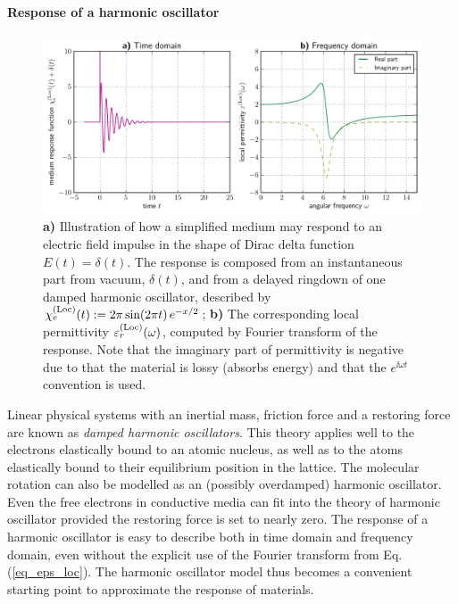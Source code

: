\paragraph{Response of a harmonic oscillator} \label{chap_lorentzmedia} %
\begin{figure}[t] \caption{\textbf{a)} Illustration of how a simplified medium may respond to an electric field impulse in the shape of Dirac delta function  $E(t) = \delta(t)$. The response is composed from an instantaneous part from vacuum, $\delta(t)$, and from a delayed ringdown of one damped harmonic oscillator, described by $\chi_e^{\rm(Loc)}(t) := 2\pi \sin(2\pi t)\,e^{-x/2}$; \textbf{b)} The corresponding local permittivity $\varepsilon^{\rm(Loc)}_r(\omega)$, computed by Fourier transform of the response. Note that the imaginary part of permittivity is negative due to that the material is lossy (absorbs energy) and that the $e^{\ii\omega t}$ convention is used.} \label{fg_oscillator_spectrum} \centering 
	\includegraphics[width=15cm]{img/oscillator_spectrum.pdf}
\end{figure}
Linear physical systems with an inertial mass, friction force and a restoring force are known as \textit{damped harmonic oscillators}. 
This theory applies well to the electrons elastically bound to an atomic nucleus, as well as to the atoms elastically bound to their equilibrium position in the lattice. The molecular rotation can also be modelled as an (possibly overdamped) harmonic oscillator. Even the free electrons in conductive media can fit into the theory of harmonic oscillator provided the restoring force is set to nearly zero. The response of a harmonic oscillator is easy to describe both in time domain and frequency domain, even without the explicit use of the Fourier transform from Eq. (\ref{eq_eps_loc}). The harmonic oscillator model thus becomes a convenient starting point to approximate the response of materials.

